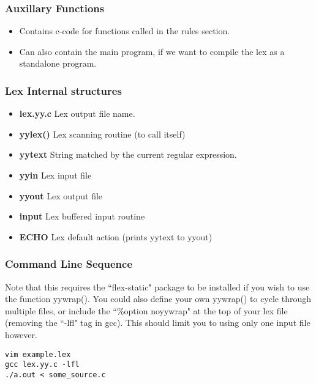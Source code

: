 \documentclass{report}
\theoremstyle{definition}
\begin{document}
			\subsubsection{Auxillary Functions}
				\begin{itemize}
					\item Contains c-code for functions called in the rules section.
					\item Can also contain the main program, if we want to compile the lex as a standalone program.
				\end{itemize}
			\subsubsection{Lex Internal structures}
				\begin{itemize}
					\item \textbf{lex.yy.c} Lex output file name.
					\item \textbf{yylex()} Lex scanning routine (to call itself)
					\item \textbf{yytext} String matched by the current regular expression.
					\item \textbf{yyin} Lex input file
					\item \textbf{yyout} Lex output file
					\item \textbf{input} Lex buffered input routine
					\item \textbf{ECHO} Lex default action (prints yytext to yyout)
				\end{itemize}
			\subsubsection{Command Line Sequence}
				Note that this requires the ``flex-static" package to be installed if you wish to use the function yywrap().
				You could also define your own yywrap() to cycle through multiple files, or include the ``\%option noyywrap"
				at the top of your lex file (removing the ``-lfl" tag in gcc). This should limit you to using only one 
				input file however.
\begin{lstlisting}
vim example.lex
gcc lex.yy.c -lfl
./a.out < some_source.c
\end{lstlisting}
\end{document}
